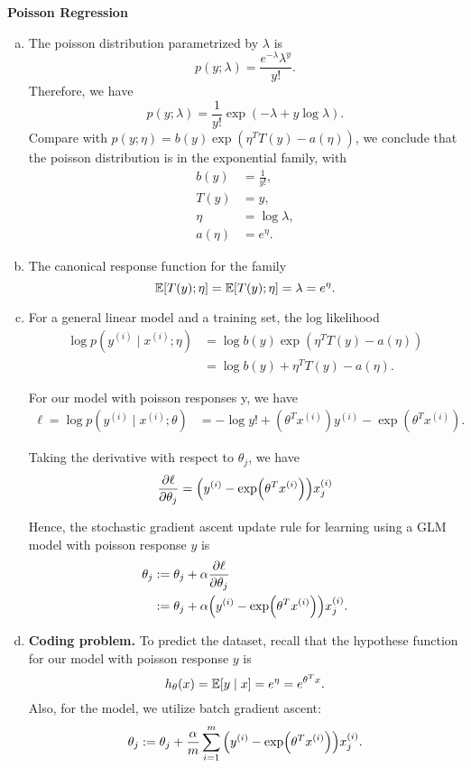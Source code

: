 \documentclass[12pt,letterpaper,boxed]{hmcpset}
\newcommand{\yy}{y^{(i)}}
\newcommand{\xx}{x^{(i)}}
\begin{document}
\begin{problem}[Problem 3]
  \textbf{Poisson Regression}
\end{problem}
\begin{solution}
\begin{enumerate}[(a)]
  \item The poisson distribution parametrized by $\lambda$ is 
  \[
  p(y ; \lambda) = \frac{e^{-\lambda} \lambda^y}{y!}.
  \]
  Therefore, we have
  \[
    p(y ; \lambda) = \frac{1}{y!} \exp(-\lambda + y \log \lambda).
  \]
  Compare with $p(y ; \eta) = b(y) \exp (\eta^T T(y) - a(\eta))$, we conclude that the poisson distribution is in the exponential family, with
  \[
  \begin{aligned}
    b(y) &= \frac{1}{y!}, \\
    T(y) &= y, \\
    \eta &= \log \lambda, \\
    a(\eta) &= e^\eta.
  \end{aligned}
  \]

  \item The canonical response function for the family
  \[
  \mathbb{E}[T(y); \eta] = \mathbb{E}[T(y); \eta] = \lambda = e^\eta.
  \]

  \item For a general linear model and a training set, the log likelihood
  \[
  \begin{aligned}
    \log p(\yy \mid \xx; \eta) &= \log b(y) \exp(\eta^T T(y) - a(\eta)) \\
    &= \log b(y) + \eta^T T(y) - a(\eta).
  \end{aligned}
  \]
  
  For our model with poisson responses y, we have
  \[
  \begin{aligned}
    \ell = \log p(\yy \mid \xx; \theta) &= - \log y! + (\theta^T \xx) \yy - \exp(\theta^T \xx).
  \end{aligned}
  \]

  Taking the derivative with respect to $\theta_j$, we have
  \[
  \pdv{\ell}{\theta_j} = \qty(\yy - \exp(\theta^T \xx)) \xx_j
  \]

  Hence, the stochastic gradient ascent update rule for learning using a GLM model with poisson response $y$ is 
  \[
  \begin{aligned}
    \theta_j &:= \theta_j + \alpha \pdv{\ell}{\theta_j} \\
    &:= \theta_j + \alpha \qty(\yy - \exp(\theta^T \xx)) \xx_j.
  \end{aligned}
  \]

  \item \textbf{Coding problem.} To predict the dataset, recall that the hypothese function for our model with poisson response $y$ is
  \[
  h_\theta(x) = \mathbb{E}[y \mid x] = e^{\eta} = e^{\theta^T x}.
  \]
  Also, for the model, we utilize batch gradient ascent:
  \[
  \theta_j := \theta_j + \frac{\alpha}{m} \sum_{i=1}^{m}  \qty(\yy - \exp(\theta^T \xx)) \xx_j.
  \]

\end{enumerate}
\end{solution}
\end{document}
